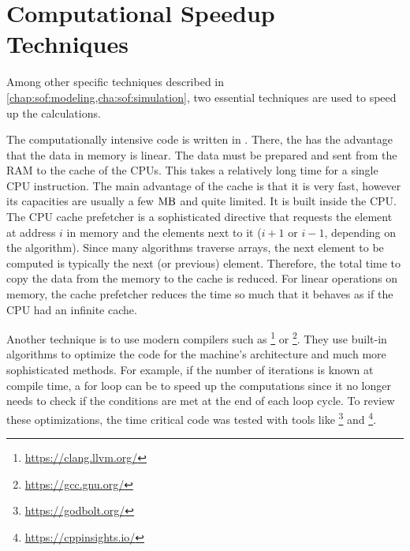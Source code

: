 \section{Computational Speedup Techniques}\label{sec:theorySpeedup}
%
Among other specific techniques described in \cref{chap:sof:modeling,cha:sof:simulation}, two essential techniques are used to speed up the calculations.
\par
%
The computationally intensive code is written in \cpp{}.
There, the  has the advantage that the data in memory is linear.
The data must be prepared and sent from the \ac{RAM} to the cache of the \acp{CPU}.
This takes  a relatively long time for a single \ac{CPU} instruction.
The main advantage of the cache is that it is very fast, however its capacities are usually a few $\si{\mega\byte}$ and quite limited.
It is built inside the \ac{CPU}.
The \ac{CPU} cache prefetcher is a sophisticated directive that requests the element at address $i$ in memory and the elements next to it ($i+1$ or $i-1$, depending on the algorithm).
Since many algorithms traverse arrays, the next element to be computed is typically the next (or previous) element.
Therefore, the total time to copy the data from the memory to the cache is reduced.
For linear operations on memory, the cache prefetcher reduces the time so much that it behaves as if the \ac{CPU} had an infinite cache.
\par
%
Another technique is to use modern compilers such as \footnote{\url{https://clang.llvm.org/}} or \footnote{\url{https://gcc.gnu.org/}}.
They use built-in algorithms to optimize the code for the machine's architecture and much more sophisticated methods.
For example, if the number of iterations is known at compile time, a for loop can be  to speed up the computations since it no longer needs to check if the conditions  are met at the end of each loop cycle.
To review these optimizations, the time critical code was tested with tools like \footnote{\url{https://godbolt.org/}} and \footnote{\url{https://cppinsights.io/}}.
%
%
%
